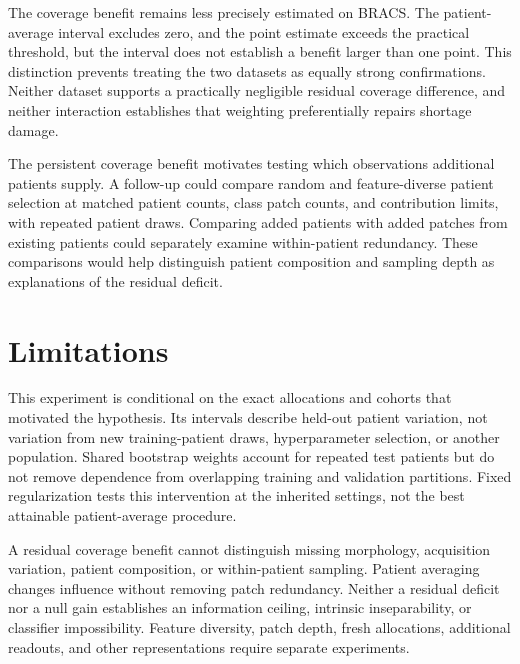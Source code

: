 \documentclass[11pt]{article}
\begin{document}
The coverage benefit remains less precisely estimated on BRACS. The patient-average interval excludes zero, and the point estimate exceeds the practical threshold, but the interval does not establish a benefit larger than one point. This distinction prevents treating the two datasets as equally strong confirmations. Neither dataset supports a practically negligible residual coverage difference, and neither interaction establishes that weighting preferentially repairs shortage damage.

The persistent coverage benefit motivates testing which observations additional patients supply. A follow-up could compare random and feature-diverse patient selection at matched patient counts, class patch counts, and contribution limits, with repeated patient draws. Comparing added patients with added patches from existing patients could separately examine within-patient redundancy. These comparisons would help distinguish patient composition and sampling depth as explanations of the residual deficit.

\section{Limitations}
\label{sec:limitations}
This experiment is conditional on the exact allocations and cohorts that motivated the hypothesis. Its intervals describe held-out patient variation, not variation from new training-patient draws, hyperparameter selection, or another population. Shared bootstrap weights account for repeated test patients but do not remove dependence from overlapping training and validation partitions. Fixed regularization tests this intervention at the inherited settings, not the best attainable patient-average procedure.

A residual coverage benefit cannot distinguish missing morphology, acquisition variation, patient composition, or within-patient sampling. Patient averaging changes influence without removing patch redundancy. Neither a residual deficit nor a null gain establishes an information ceiling, intrinsic inseparability, or classifier impossibility. Feature diversity, patch depth, fresh allocations, additional readouts, and other representations require separate experiments.



\end{document}
